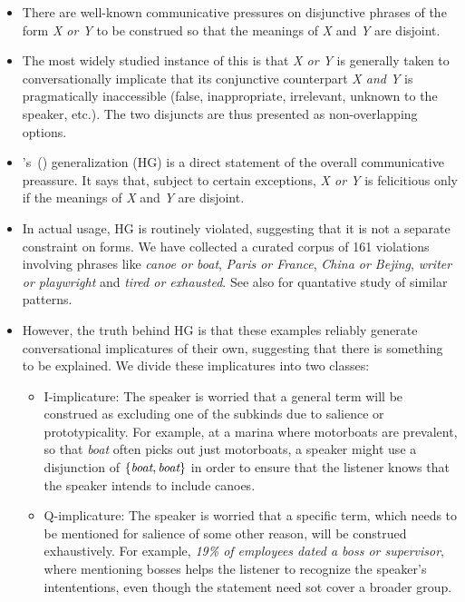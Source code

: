 \documentclass[12pt]{article}
\newcommand{\word}[1]{\emph{#1}}
\newcommand{\set}[1]{\ensuremath{\left\{#1\right\}}}
\newcommand{\posscitet}[1]{\citeauthor{#1}'s~(\citeyear{#1})}
\begin{document}
\begin{itemize}

\item
There are well-known communicative pressures on disjunctive phrases of
the form \word{X or Y} to be construed so that the meanings of
\word{X} and \word{Y} are disjoint. 

\item
The most widely studied instance of this is that \word{X or Y} is
generally taken to conversationally implicate that its conjunctive
counterpart \word{X and Y} is pragmatically inaccessible (false,
inappropriate, irrelevant, unknown to the speaker, etc.). The two
disjuncts are thus presented as non-overlapping options.

\item
\posscitet{Hurford:1974} generalization (HG) is a direct statement of the
overall communicative preassure. It says that, subject to certain
exceptions, \word{X or Y} is felicitious only if the meanings of
\word{X} and \word{Y} are disjoint. 

\item
In actual usage, HG is routinely violated, suggesting that it is not a
separate constraint on forms. We have collected a curated corpus of
161 violations involving phrases like \word{canoe or boat},
\word{Paris or France}, \word{China or Bejing}, \word{writer or
  playwright} and \word{tired or exhausted}. See also
\citet{Chemla-HurfordCounts} for quantative study of similar patterns.

\item
However, the truth behind HG is that these examples reliably generate
conversational implicatures of their own, suggesting that there is 
something to be explained. We divide these implicatures into two 
classes:

\begin{itemize}

\item
I-implicature: The speaker is worried that a general term will be
construed as excluding one of the subkinds due to salience or
prototypicality. For example, at a marina where motorboats are
prevalent, so that \word{boat} often picks out just motorboats, a
speaker might use a disjunction of \set{\word{boat}, \word{boat}} in
order to ensure that the listener knows that the speaker intends to
include canoes.

\item
Q-implicature: The speaker is worried that a specific term, which
needs to be mentioned for salience of some other reason, will be
construed exhaustively. For example, \word{19\% of employees dated a
  boss or supervisor}, where mentioning bosses helps the listener
to recognize the speaker's intententions, even though the statement
need sot cover a broader group.


\end{itemize}
\end{itemize}
\end{document}
